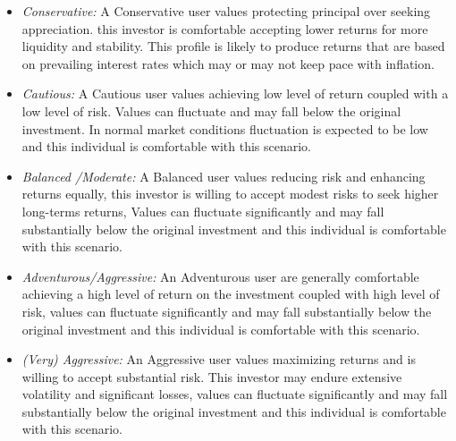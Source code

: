 \documentclass[	DIV=calc,%
							paper=letter,%
							fontsize=12pt%
                            ]{scrartcl}	 					%
\begin{document}
\begin{itemize}
\item \textit{Conservative:} A Conservative user values protecting principal over seeking appreciation. this investor is comfortable accepting lower returns for more liquidity and stability. This profile is likely to produce returns that are based on prevailing interest rates which may or may not keep pace with inflation.

\item \textit{Cautious:}  A Cautious user values achieving low level of return coupled with a low level of risk. Values can fluctuate and may fall below the original investment. In normal market conditions fluctuation is expected to be low and this individual is comfortable with this scenario.

\item \textit{Balanced /Moderate:}  A Balanced user values reducing risk and enhancing returns equally, this investor is willing to accept modest risks to seek higher long-terms returns, Values can fluctuate significantly and may fall substantially below the original investment and this individual is comfortable with this scenario.

\item \textit{Adventurous/Aggressive:} An Adventurous user are generally comfortable achieving a high level of return on the investment coupled with high level of risk, values can fluctuate significantly and may fall substantially below the original investment and this individual is comfortable with this scenario.
 
\item \textit{(Very) Aggressive:} An Aggressive user values maximizing returns and is willing to accept substantial risk. This investor may endure extensive volatility and significant losses, values can fluctuate significantly and may fall substantially below the original investment and this individual is comfortable with this scenario.
\end{itemize}
\end{document}
